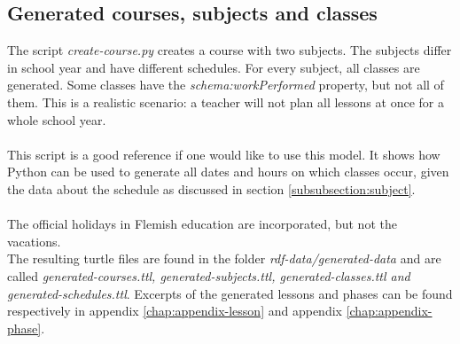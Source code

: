 \documentclass[a4paper]{report}
\begin{document}
    \subsection{Generated courses, subjects and classes}
    The script \emph{create-course.py} creates a course with two subjects. The subjects differ in school year and have different schedules.
    For every subject, all classes are generated. Some classes have the \emph{schema:workPerformed} property, but not all of them.
    This is a realistic scenario: a teacher will not plan all lessons at once for a whole school year.\\ \\
    This script is a good reference if one would like to use this model.
    It shows how Python can be used to generate all dates and hours on which classes occur, given the data about the schedule as discussed in section \ref{subsubsection:subject}.\\ \\
    The official holidays in Flemish education are incorporated, but not the vacations.\\
    The resulting turtle files are found in the folder \emph{rdf-data/generated-data} and are called \emph{generated-courses.ttl, generated-subjects.ttl, generated-classes.ttl and generated-schedules.ttl}.
    Excerpts of the generated lessons and phases can be found respectively in appendix \ref{chap:appendix-lesson} and appendix \ref{chap:appendix-phase}.
\end{document}
